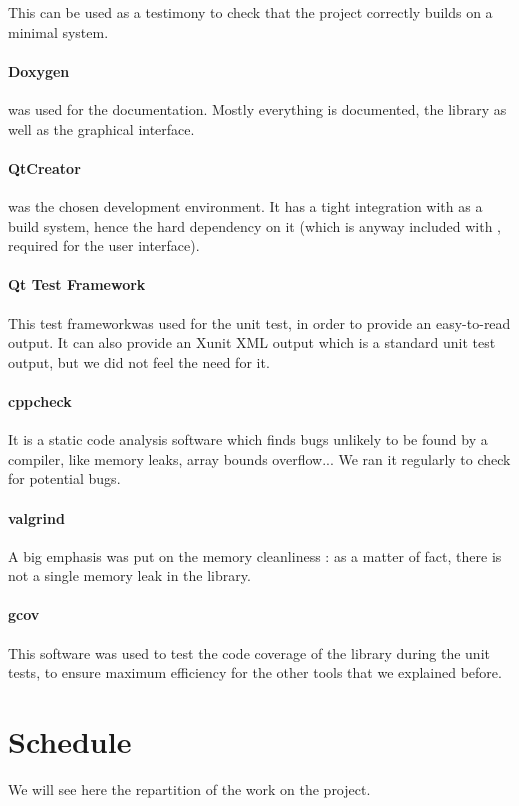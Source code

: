This can be used as a testimony to check that the project correctly builds on a minimal system.

\paragraph{Doxygen} was used for the documentation. Mostly everything is documented, the library as well as the graphical interface.

\paragraph{QtCreator} was the chosen development environment. It has a tight integration with  as a build system, hence the hard dependency on it (which is anyway included with , required for the user interface). 

\paragraph{Qt Test Framework}
This test frameworkwas used for the unit test, in order to provide an easy-to-read output. It can also provide an Xunit XML output which is a standard unit test output, but we did not feel the need for it. 

\paragraph{cppcheck}
It is a static code analysis software which finds bugs unlikely to be found by a compiler, like memory leaks, array bounds overflow... We ran it regularly to check for potential bugs.

\paragraph{valgrind}
A big emphasis was put on the memory cleanliness : as a matter of fact, there is not a single memory leak in the library.

\paragraph{gcov}
This software was used to test the code coverage of the library during the unit tests, to ensure maximum efficiency for the other tools that we explained before.

\section{Schedule}
We will see here the repartition of the work on the project.

